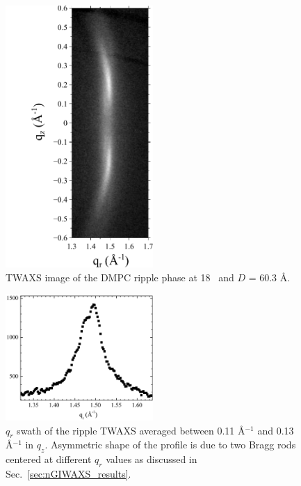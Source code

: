 \begin{figure}[htbp]
  \centering
  \includegraphics[trim=20 0 10 0,clip,width=0.5\textwidth]{figures/ripple/TWAXS/twaxs_ripple}
  \caption[TWAXS image of the DMPC ripple phase]{TWAXS image of the DMPC
  ripple phase at 18 \textcelsius\ and $D$ = 60.3 \AA.}
  \label{fig:twaxs_ripple}
\end{figure}

\begin{figure}[htbp]
  \centering
  \includegraphics[width=0.5\textwidth]{figures/ripple/TWAXS/twaxs_weak_qr}
  \caption{$q_r$ swath of the ripple TWAXS averaged between 0.11 \AA$^{-1}$
  and 0.13 \AA$^{-1}$ in $q_z$. Asymmetric shape of the profile is due to
  two Bragg rods centered at different $q_r$ values as discussed in
  Sec.~\ref{sec:nGIWAXS_results}.}
  \label{fig:twaxs_weak_qr}
\end{figure}

